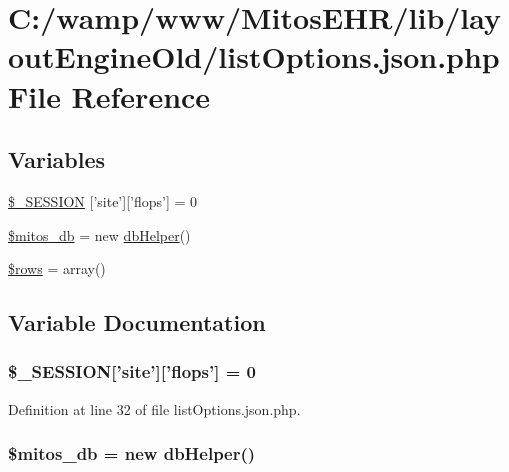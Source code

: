 \hypertarget{list_options_8json_8php}{\section{\-C\-:/wamp/www/\-Mitos\-E\-H\-R/lib/layout\-Engine\-Old/list\-Options.json.\-php \-File \-Reference}
\label{list_options_8json_8php}
}
\subsection*{\-Variables}
\begin{DoxyCompactItemize}
\item 
\hyperlink{list_options_8json_8php_a99fda8552a3e58235643b79f5af3ded8}{\$\-\_\-\-S\-E\-S\-S\-I\-O\-N} \mbox{[}'site'\mbox{]}\mbox{[}'flops'\mbox{]} = 0
\item 
\hyperlink{list_options_8json_8php_ab5d961f93efe4e2e8d8374f01dd6c65a}{\$mitos\-\_\-db} = new \hyperlink{classdb_helper}{db\-Helper}()
\item 
\hyperlink{list_options_8json_8php_ace2ec39e7df3899fa8df9640ec274b03}{\$rows} = array()
\end{DoxyCompactItemize}


\subsection{\-Variable \-Documentation}
\hypertarget{list_options_8json_8php_a99fda8552a3e58235643b79f5af3ded8}{
\subsubsection[{\$\-\_\-\-S\-E\-S\-S\-I\-O\-N}]{\setlength{\rightskip}{0pt plus 5cm}\$\-\_\-\-S\-E\-S\-S\-I\-O\-N\mbox{[}'site'\mbox{]}\mbox{[}'flops'\mbox{]} = 0}}\label{list_options_8json_8php_a99fda8552a3e58235643b79f5af3ded8}


\-Definition at line 32 of file list\-Options.\-json.\-php.

\hypertarget{list_options_8json_8php_ab5d961f93efe4e2e8d8374f01dd6c65a}{
\subsubsection[{\$mitos\-\_\-db}]{\setlength{\rightskip}{0pt plus 5cm}\$mitos\-\_\-db = new {\bf db\-Helper}()}}\label{list_options_8json_8php_ab5d961f93efe4e2e8d8374f01dd6c65a}


